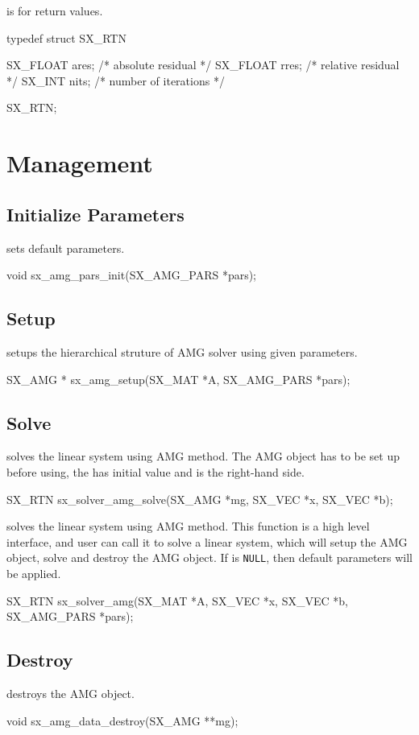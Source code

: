  is for return values.
\begin{evb}
typedef struct SX_RTN
{
    SX_FLOAT ares;     /* absolute residual */
    SX_FLOAT rres;     /* relative residual */
    SX_INT   nits;     /* number of iterations */

} SX_RTN;
\end{evb}

\section{Management}

\subsection{Initialize Parameters}

 sets default parameters.
\begin{evb}
void sx_amg_pars_init(SX_AMG_PARS *pars);
\end{evb}

\subsection{Setup}
 setups the hierarchical struture of AMG solver using given parameters.
\begin{evb}
SX_AMG * sx_amg_setup(SX_MAT *A, SX_AMG_PARS *pars);
\end{evb}

\subsection{Solve}

 solves the linear system using AMG method. The AMG object has to be
set up before using, the  has initial value and  is the right-hand side.
\begin{evb}
SX_RTN sx_solver_amg_solve(SX_AMG *mg, SX_VEC *x, SX_VEC *b);
\end{evb}

 solves the linear system using AMG method. This function is a high level 
interface, and user can call it to solve a linear system, which will setup the AMG object,
solve and destroy the AMG object. If  is \verb|NULL|, then default parameters
will be applied.
\begin{evb}
SX_RTN sx_solver_amg(SX_MAT *A, SX_VEC *x, SX_VEC *b, SX_AMG_PARS *pars);
\end{evb}

\subsection{Destroy}
 destroys the AMG object.
\begin{evb}
void sx_amg_data_destroy(SX_AMG **mg);
\end{evb}

